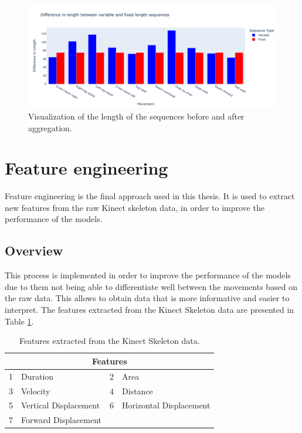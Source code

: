 \begin{figure}[H]
    \centering
    \includegraphics[width=1.0\textwidth]{../src/resources/plots/length.png}
    \caption{
        Visualization of the length of the sequences before and after aggregation.
    }
    \label{fig:seqlength}
\end{figure}

    \newpage
    
    \section{Feature engineering} \label{sec:feature_engineering}
        
        Feature engineering is the final approach used in this thesis. It is used to extract new features from the raw Kinect skeleton data, in order to improve the performance of the models.

        \subsection{Overview}

            This process is implemented  in order to improve the performance of the models due to them not being able to differentiate well between the movements based on the raw data. This allows to obtain data that is more informative and easier to interpret. The features extracted from the Kinect Skeleton data are presented in Table \ref{tab:features_table}.

        \begin{table}[htbp]
            \centering
            \begin{tabular}{@{}clcl@{}}
                \toprule
                \multicolumn{4}{c}{\textbf{Features}} \\
                \midrule
                1 & Duration & 2 & Area \\
                3 & Velocity & 4 & Distance \\
                5 & Vertical Displacement & 6 & Horizontal Displacement \\
                7 & Forward Displacement &  & \\
                \bottomrule
            \end{tabular}
            \caption{Features extracted from the Kinect Skeleton data.}
            \label{tab:features_table}
        \end{table}

